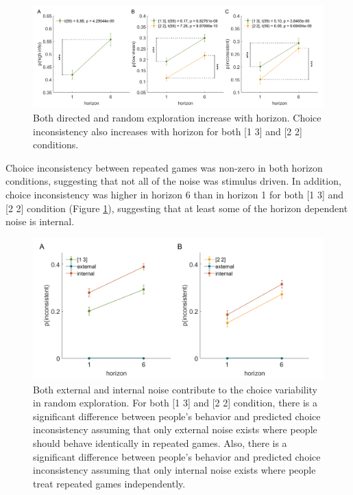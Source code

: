 \documentclass[12pt]{article}
\begin{document}
	\begin{figure}[H]
		\begin{center}
			\includegraphics[width=\textwidth]{figures/modelfree.png}
			\caption{Both directed and random exploration increase with horizon. Choice inconsistency also increases with horizon for both [1 3] and [2 2] conditions. }
			\label{fig:modelfree}
		\end{center}
	\end{figure}
	
	Choice inconsistency between repeated games was non-zero in both horizon conditions, suggesting that not all of the noise was stimulus driven.  In addition, choice inconsistency was higher in horizon 6 than in horizon 1 for both [1 3] and [2 2] condition (Figure \ref{fig:modelfree}), suggesting that at least some of the horizon dependent noise is internal.
	
	\begin{figure}[H]
		\begin{center}
			\includegraphics[width=\textwidth]{figures/modelfree_intext.png}
			\caption[Both external and internal noise contribute to the choice variability in random exploration]{Both external and internal noise contribute to the choice variability in random exploration. For both [1 3] and [2 2] condition, there is a significant difference between people's behavior and predicted choice inconsistency assuming that only external noise exists where people should behave identically in repeated games. Also, there is a significant difference between people's behavior and predicted choice inconsistency assuming that only internal noise exists where people treat repeated games independently. }
			\label{fig:mf2}
		\end{center}
	\end{figure}
	
\end{document}
